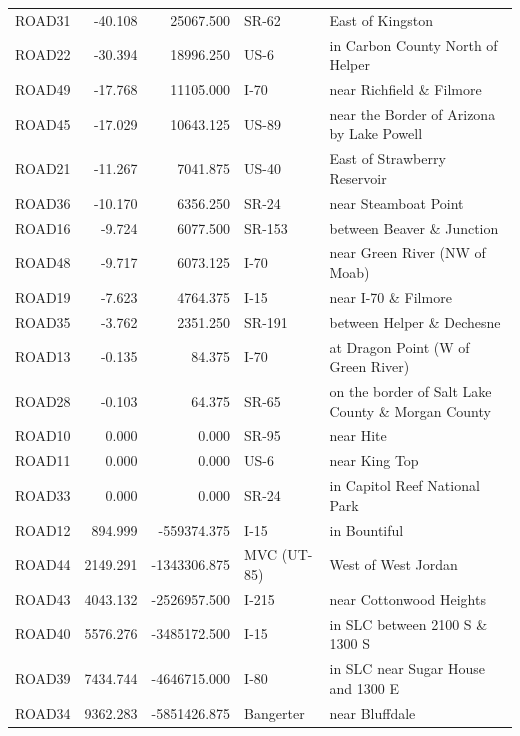 \begin{table}
\begin{tabular}[t]{lrrll}
\addlinespace
ROAD31 & -40.108 & 25067.500 & SR-62 & East of Kingston\\
ROAD22 & -30.394 & 18996.250 & US-6 & in Carbon County North of Helper\\
ROAD49 & -17.768 & 11105.000 & I-70 & near Richfield \& Filmore\\
ROAD45 & -17.029 & 10643.125 & US-89 & near the Border of Arizona by Lake Powell\\
ROAD21 & -11.267 & 7041.875 & US-40 & East of Strawberry Reservoir\\
\addlinespace
ROAD36 & -10.170 & 6356.250 & SR-24 & near Steamboat Point\\
ROAD16 & -9.724 & 6077.500 & SR-153 & between Beaver \& Junction\\
ROAD48 & -9.717 & 6073.125 & I-70 & near Green River (NW of Moab)\\
ROAD19 & -7.623 & 4764.375 & I-15 & near I-70 \& Filmore\\
ROAD35 & -3.762 & 2351.250 & SR-191 & between Helper \& Dechesne\\
\addlinespace
ROAD13 & -0.135 & 84.375 & I-70 & at Dragon Point (W of Green River)\\
ROAD28 & -0.103 & 64.375 & SR-65 & on the border of Salt Lake County \& Morgan County\\
ROAD10 & 0.000 & 0.000 & SR-95 & near Hite\\
ROAD11 & 0.000 & 0.000 & US-6 & near King Top\\
ROAD33 & 0.000 & 0.000 & SR-24 & in Capitol Reef National Park\\
\addlinespace
ROAD12 & 894.999 & -559374.375 & I-15 & in Bountiful\\
ROAD44 & 2149.291 & -1343306.875 & MVC (UT-85) & West of West Jordan\\
ROAD43 & 4043.132 & -2526957.500 & I-215 & near Cottonwood Heights\\
ROAD40 & 5576.276 & -3485172.500 & I-15 & in SLC between 2100 S \& 1300 S\\
ROAD39 & 7434.744 & -4646715.000 & I-80 & in SLC near Sugar House and 1300 E\\
\addlinespace
ROAD34 & 9362.283 & -5851426.875 & Bangerter & near Bluffdale\\
\bottomrule
\end{tabular}
\end{table}

